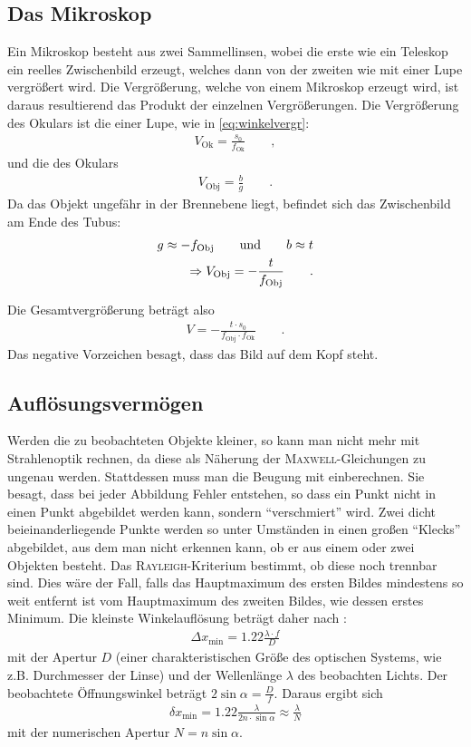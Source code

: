 \documentclass[12pt,a4paper,titlepage,headinclude,bibtotoc]{scrartcl}
\begin{document}
\subsection{Das Mikroskop}
Ein Mikroskop besteht aus zwei Sammellinsen, wobei die erste wie ein Teleskop ein reelles Zwischenbild erzeugt, welches dann von der zweiten wie mit einer Lupe vergrößert wird.
Die Vergrößerung, welche von einem Mikroskop erzeugt wird, ist daraus resultierend das Produkt der einzelnen Vergrößerungen.
Die Vergrößerung des Okulars ist die einer Lupe, wie in \eqref{eq:winkelvergr}:
\begin{align}
V_\text{Ok}=\frac{s_0}{f_\text{Ok}}\qquad ,
\end{align}
und die des Okulars
\begin{align}
V_\text{Obj}=\frac{b}{g}\qquad .
\end{align}
Da das Objekt ungefähr in der Brennebene liegt, befindet sich das Zwischenbild am Ende des Tubus:
\begin{align}
\notag g\approx -f_\text{Obj} \qquad \text{und}\qquad b\approx t\\
\Rightarrow V_\text{Obj}=-\frac{t}{f_\text{Obj}}\qquad .
\end{align}

Die Gesamtvergrößerung beträgt also
\begin{align}
V=-\frac{t\cdot s_0}{f_\text{Obj}\cdot f_\text{Ok}}\qquad .
\end{align}
Das negative Vorzeichen besagt, dass das Bild auf dem Kopf steht.

\subsection{Auflösungsvermögen}
Werden die zu beobachteten Objekte kleiner, so kann man nicht mehr mit Strahlenoptik rechnen, da diese als Näherung der \textsc{Maxwell}-Gleichungen zu ungenau werden.
Stattdessen muss man die Beugung mit einberechnen.
Sie besagt, dass bei jeder Abbildung Fehler entstehen, so dass ein Punkt nicht in einen Punkt abgebildet werden kann, sondern "`verschmiert"' wird.
Zwei dicht beieinanderliegende Punkte werden so unter Umständen in einen großen "`Klecks"' abgebildet, aus dem man nicht erkennen kann, ob er aus einem oder zwei Objekten besteht.
Das \textsc{Rayleigh}-Kriterium bestimmt, ob diese noch trennbar sind.
Dies wäre der Fall, falls das Hauptmaximum des ersten Bildes mindestens so weit entfernt ist vom Hauptmaximum des zweiten Bildes, wie dessen erstes Minimum.
Die kleinste Winkelauflösung beträgt daher nach \cite[S. 368]{demtroeder2}:
\begin{align*}
	\Delta x_\text{min}=1.22\frac{\lambda\cdot f}{D}
\end{align*}
mit der Apertur $D$ (einer charakteristischen Größe des optischen Systems, wie z.B. Durchmesser der Linse) und der Wellenlänge $\lambda$ des beobachten Lichts.
Der beobachtete Öffnungswinkel beträgt $2\sin\alpha=\frac Df$.
Daraus ergibt sich
\begin{align}
\delta x_\text{min}=1.22\frac{\lambda}{2n\cdot\sin\alpha}\approx\frac{\lambda}{N}
\end{align}
mit der numerischen Apertur $N=n\sin\alpha$.
\end{document}
